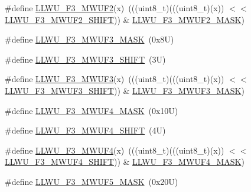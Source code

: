\begin{DoxyCompactItemize}
\item 
\#define \mbox{\hyperlink{group___l_l_w_u___register___masks_gac71e0c2b5effba209a76bdea4199dcc9}{L\+L\+W\+U\+\_\+\+F3\+\_\+\+M\+W\+U\+F2}}(x)~(((uint8\+\_\+t)(((uint8\+\_\+t)(x)) $<$$<$ \mbox{\hyperlink{group___l_l_w_u___register___masks_gac83dee08de7a4bdce21d454a9cfab059}{L\+L\+W\+U\+\_\+\+F3\+\_\+\+M\+W\+U\+F2\+\_\+\+S\+H\+I\+FT}})) \& \mbox{\hyperlink{group___l_l_w_u___register___masks_ga3414123c30550a3dea14d84f931e2a0c}{L\+L\+W\+U\+\_\+\+F3\+\_\+\+M\+W\+U\+F2\+\_\+\+M\+A\+SK}})
\item 
\#define \mbox{\hyperlink{group___l_l_w_u___register___masks_gab85f671f2c6f2112c4e2e14845ef998b}{L\+L\+W\+U\+\_\+\+F3\+\_\+\+M\+W\+U\+F3\+\_\+\+M\+A\+SK}}~(0x8\+U)
\item 
\#define \mbox{\hyperlink{group___l_l_w_u___register___masks_ga91a71ba06b95076252cd2594112da05d}{L\+L\+W\+U\+\_\+\+F3\+\_\+\+M\+W\+U\+F3\+\_\+\+S\+H\+I\+FT}}~(3\+U)
\item 
\#define \mbox{\hyperlink{group___l_l_w_u___register___masks_gaf456eb8a736c3ef4d9813e6c8929fa05}{L\+L\+W\+U\+\_\+\+F3\+\_\+\+M\+W\+U\+F3}}(x)~(((uint8\+\_\+t)(((uint8\+\_\+t)(x)) $<$$<$ \mbox{\hyperlink{group___l_l_w_u___register___masks_ga91a71ba06b95076252cd2594112da05d}{L\+L\+W\+U\+\_\+\+F3\+\_\+\+M\+W\+U\+F3\+\_\+\+S\+H\+I\+FT}})) \& \mbox{\hyperlink{group___l_l_w_u___register___masks_gab85f671f2c6f2112c4e2e14845ef998b}{L\+L\+W\+U\+\_\+\+F3\+\_\+\+M\+W\+U\+F3\+\_\+\+M\+A\+SK}})
\item 
\#define \mbox{\hyperlink{group___l_l_w_u___register___masks_gabd85c849a3b177444a91aa37457252a8}{L\+L\+W\+U\+\_\+\+F3\+\_\+\+M\+W\+U\+F4\+\_\+\+M\+A\+SK}}~(0x10\+U)
\item 
\#define \mbox{\hyperlink{group___l_l_w_u___register___masks_gac1d2eb89a620cf503f11eecf9e8ece1f}{L\+L\+W\+U\+\_\+\+F3\+\_\+\+M\+W\+U\+F4\+\_\+\+S\+H\+I\+FT}}~(4\+U)
\item 
\#define \mbox{\hyperlink{group___l_l_w_u___register___masks_gad93b6ad2aae5b9b2b211254f8734236e}{L\+L\+W\+U\+\_\+\+F3\+\_\+\+M\+W\+U\+F4}}(x)~(((uint8\+\_\+t)(((uint8\+\_\+t)(x)) $<$$<$ \mbox{\hyperlink{group___l_l_w_u___register___masks_gac1d2eb89a620cf503f11eecf9e8ece1f}{L\+L\+W\+U\+\_\+\+F3\+\_\+\+M\+W\+U\+F4\+\_\+\+S\+H\+I\+FT}})) \& \mbox{\hyperlink{group___l_l_w_u___register___masks_gabd85c849a3b177444a91aa37457252a8}{L\+L\+W\+U\+\_\+\+F3\+\_\+\+M\+W\+U\+F4\+\_\+\+M\+A\+SK}})
\item 
\#define \mbox{\hyperlink{group___l_l_w_u___register___masks_gaeb14754fa2d5b4c1fd50b9df98f11b01}{L\+L\+W\+U\+\_\+\+F3\+\_\+\+M\+W\+U\+F5\+\_\+\+M\+A\+SK}}~(0x20\+U)
$$
\end{DoxyCompactItemize}
